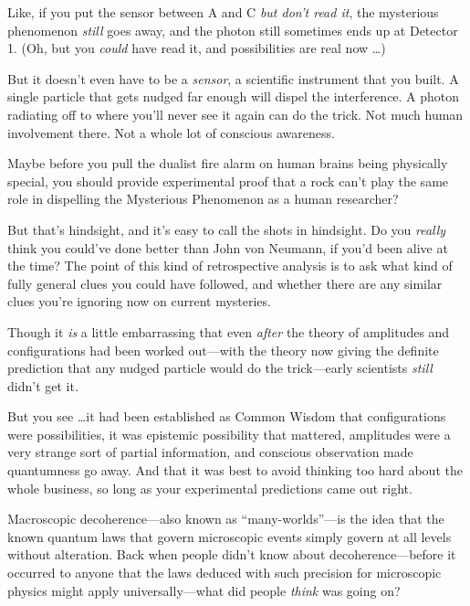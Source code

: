 {
 Like, if you put the sensor between A and C \textit{but
don't read it}, the mysterious phenomenon
\textit{still} goes away, and the photon still sometimes ends up at
Detector 1. (Oh, but you \textit{could} have read it, and possibilities
are real now \ldots)}

{
 But it doesn't even have to be a \textit{sensor},
a scientific instrument that you built. A single particle that gets
nudged far enough will dispel the interference. A photon radiating off
to where you'll never see it again can do the trick.
Not much human involvement there. Not a whole lot of conscious
awareness.}

{
 Maybe before you pull the dualist fire alarm on human brains being
physically special, you should provide experimental proof that a rock
can't play the same role in dispelling the Mysterious
Phenomenon as a human researcher?}

{
 But that's hindsight, and it's
easy to call the shots in hindsight. Do you \textit{really} think you
could've done better than John von Neumann, if
you'd been alive at the time? The point of this kind of
retrospective analysis is to ask what kind of fully general clues you
could have followed, and whether there are any similar clues
you're ignoring now on current mysteries.}

{
 Though it \textit{is} a little embarrassing that even
\textit{after} the theory of amplitudes and configurations had been
worked out---with the theory now giving the definite prediction that
any nudged particle would do the trick---early scientists
\textit{still} didn't get it.}

{
 But you see \ldots it had been established as Common Wisdom that
configurations were possibilities, it was epistemic possibility that
mattered, amplitudes were a very strange sort of partial information,
and conscious observation made quantumness go away. And that it was
best to avoid thinking too hard about the whole business, so long as
your experimental predictions came out right.}

\myendsectiontext


{
 Macroscopic decoherence{}---also known as
``many-worlds''---is the idea that
the known quantum laws that govern microscopic events simply govern at
all levels without alteration. Back when people didn't
know about decoherence---before it occurred to anyone that the laws
deduced with such precision for microscopic physics might apply
universally---what did people \textit{think} was going on? }

